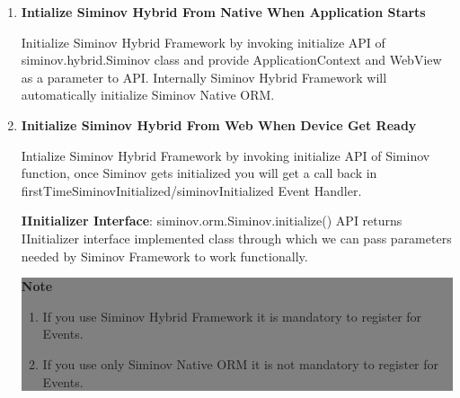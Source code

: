 \begin{enumerate}

	\item \small \textbf{Intialize Siminov Hybrid From Native When Application Starts}
		
		Initialize Siminov Hybrid Framework by invoking initialize API of siminov.hybrid.Siminov class and provide ApplicationContext and WebView as a parameter to API. Internally Siminov Hybrid Framework will automatically initialize Siminov Native ORM.
		

	\item \small \textbf{Initialize Siminov Hybrid From Web When Device Get Ready}
		
		Intialize Siminov Hybrid Framework by invoking initialize API of Siminov function, once Siminov gets initialized you will get a call back in firstTimeSiminovInitialized/siminovInitialized Event Handler.

		
	

		\par
\textbf{IInitializer Interface}: 
siminov.orm.Siminov.initialize() API returns IInitializer interface implemented class through which we can pass parameters needed by Siminov Framework to work functionally. 

		
	

		\begin{center}
			\colorbox{grey}{
				\parbox[t]{.8\linewidth}{
					\fontsize{11pt}{11pt}\selectfont %
					\vspace*{0.1cm} %
		
					\hfill \textbf{Note} \\
					
						\begin{enumerate}
			
							\item \small If you use Siminov Hybrid Framework it is mandatory to register for Events.
			
							\item \small If you use only Siminov Native ORM it is not mandatory to register for Events.

						\end{enumerate}					



					\vspace*{0.0cm} %
				}
			}

		\end{center}


\end{enumerate}






